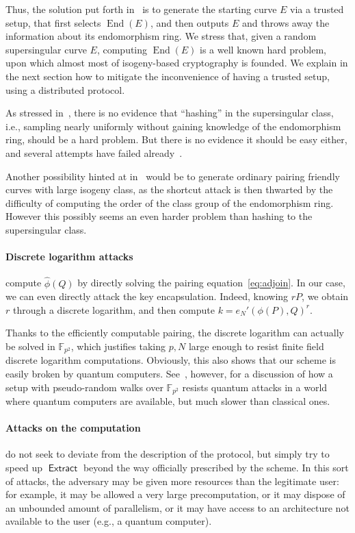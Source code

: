 \documentclass{llncs}
\newcommand{\F}{\mathbb{F}}
\DeclareMathOperator{\End}{End}
\DeclareMathOperator{\Extract}{\mathsf{Extract}}
\begin{document}
Thus, the solution put forth in~\cite{10.1007/978-3-030-34578-5_10} is
to generate the starting curve $E$ via a trusted setup, that first
selects $\End(E)$, and then outputs $E$ and throws away the
information about its endomorphism ring. %
We stress that, given a random supersingular curve $E$, computing
$\End(E)$ is a well known hard problem, upon which almost most of
isogeny-based cryptography is founded. %
We explain in the next section how to mitigate the inconvenience of
having a trusted setup, using a distributed protocol.

As stressed in~\cite{10.1007/978-3-030-34578-5_10}, there is no
evidence that ``hashing'' in the supersingular class, i.e., sampling
nearly uniformly without gaining knowledge of the endomorphism ring,
should be a hard problem. %
But there is no evidence it should be easy either, and several
attempts have failed
already~\cite{10.1007/978-3-030-45724-2_18,love2019supersingular}.

Another possibility hinted at in~\cite{10.1007/978-3-030-34578-5_10}
would be to generate ordinary pairing friendly curves with large
isogeny class, as the shortcut attack is then thwarted by the
difficulty of computing the order of the class group of the
endomorphism ring. %
However this possibly seems an even harder problem than hashing to the
supersingular class.

\paragraph{Discrete logarithm attacks} compute $\hat\phi(Q)$ by
directly solving the pairing equation~\eqref{eq:adjoin}. %
In our case, we can even directly attack the key encapsulation. %
Indeed, knowing $rP$, we obtain $r$ through a discrete logarithm, and
then compute $k=e_N'(\phi(P),Q)^r$.

Thanks to the efficiently computable pairing, the discrete logarithm
can actually be solved in $\F_{p^2}$, which justifies taking $p,N$
large enough to resist finite field discrete logarithm computations. %
Obviously, this also shows that our scheme is easily broken by quantum
computers. %
See~\cite{10.1007/978-3-030-34578-5_10}, however, for a discussion of
how a setup with pseudo-random walks over $\F_{p^2}$ resists quantum
attacks in a world where quantum computers are available, but much
slower than classical ones.

\paragraph{Attacks on the computation} do not seek to deviate from the
description of the protocol, but simply try to speed up $\Extract$
beyond the way officially prescribed by the scheme. %
In this sort of attacks, the adversary may be given more resources
than the legitimate user: for example, it may be allowed a very large
precomputation, or it may dispose of an unbounded amount of
parallelism, or it may have access to an architecture not available to
the user (e.g., a quantum computer).
\end{document}
